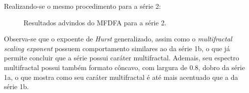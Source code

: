 \documentclass{article}[twocolumn]
\begin{document}
	Realizando-se o mesmo procedimento para a s\'erie 2:
	\begin{figure}[H]
		\centering
		\caption{Resultados advindos do MFDFA para a s\'erie 2.}
	\end{figure}
	Observa-se que o expoente de \textit{Hurst} generalizado, assim como o \textit{multifractal
	scaling exponent} possuem comportamento similares ao da s\'erie 1b, o que j\'a permite concluir
	que a s\'erie possui car\'ater multifractal. Ademais, seu espectro
	multifractal possui tamb\'em formato c\^oncavo, com largura de 0.8, dobro da s\'erie 1a,
	o que mostra como seu car\'ater multifractal \'e at\'e mais acentuado que a da s\'erie 1b.
\end{document}
